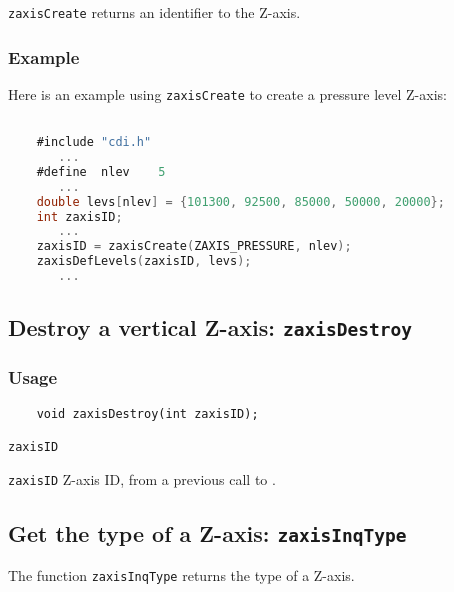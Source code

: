 {\texttt{zaxisCreate}} returns an identifier to the Z-axis.


\subsubsection*{Example}

Here is an example using {\texttt{zaxisCreate}} to create a pressure level Z-axis:

\begin{lstlisting}[language=C, backgroundcolor=\color{pyellow}, basicstyle=\small, columns=flexible]

    #include "cdi.h"
       ...
    #define  nlev    5
       ...
    double levs[nlev] = {101300, 92500, 85000, 50000, 20000};
    int zaxisID;
       ...
    zaxisID = zaxisCreate(ZAXIS_PRESSURE, nlev);
    zaxisDefLevels(zaxisID, levs);
       ...
\end{lstlisting}


\subsection{Destroy a vertical Z-axis: \texttt{zaxisDestroy}}
\label{zaxisDestroy}
\subsubsection*{Usage}

\begin{verbatim}
    void zaxisDestroy(int zaxisID);
\end{verbatim}

\hspace*{4mm}\begin{minipage}[]{15cm}
\begin{deflist}{\texttt{zaxisID}\ }
\item[\texttt{zaxisID}]
Z-axis ID, from a previous call to {}.

\end{deflist}
\end{minipage}


\subsection{Get the type of a Z-axis: \texttt{zaxisInqType}}
\label{zaxisInqType}

The function {\texttt{zaxisInqType}} returns the type of a Z-axis.

